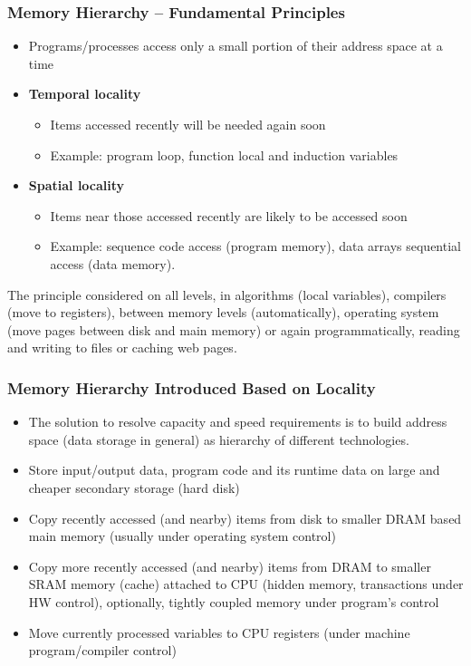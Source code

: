 \documentclass{beamer}
\begin{document}
\begin{frame}
\frametitle{Memory Hierarchy -- Fundamental Principles}

\begin{itemize}
\item Programs/processes access only a small portion of their address space at a time
\item \textbf{Temporal locality}
\begin{itemize}
\item Items accessed recently will be needed again soon
\item Example: program loop, function local and induction variables
\end{itemize}
\item \textbf{Spatial locality}
\begin{itemize}
\item Items near those accessed recently are likely to be accessed soon
\item Example: sequence code access (program memory), data arrays sequential access (data memory).
\end{itemize}
\end{itemize}
The principle considered on all levels, in algorithms (local variables), compilers (move to registers), between memory levels (automatically), operating system (move pages between disk and main memory) or again programmatically, reading and writing to files or caching web pages.

\end{frame}


\begin{frame}
\frametitle{Memory Hierarchy Introduced Based on Locality}

\begin{itemize}
\item The solution to resolve capacity and speed requirements is to build address space (data storage in general) as hierarchy of different technologies.
\item Store input/output data, program code and its runtime data on large and cheaper secondary storage (hard disk)
\item Copy recently accessed (and nearby) items from disk to smaller DRAM based main memory (usually under operating system control)
\item Copy more recently accessed (and nearby) items from DRAM to smaller SRAM memory (cache) attached to CPU (hidden memory, transactions under HW control), optionally, tightly coupled memory under program's control
\item Move currently processed variables to CPU registers (under machine program/compiler control) 
\end{itemize}

\end{frame}
\end{document}
